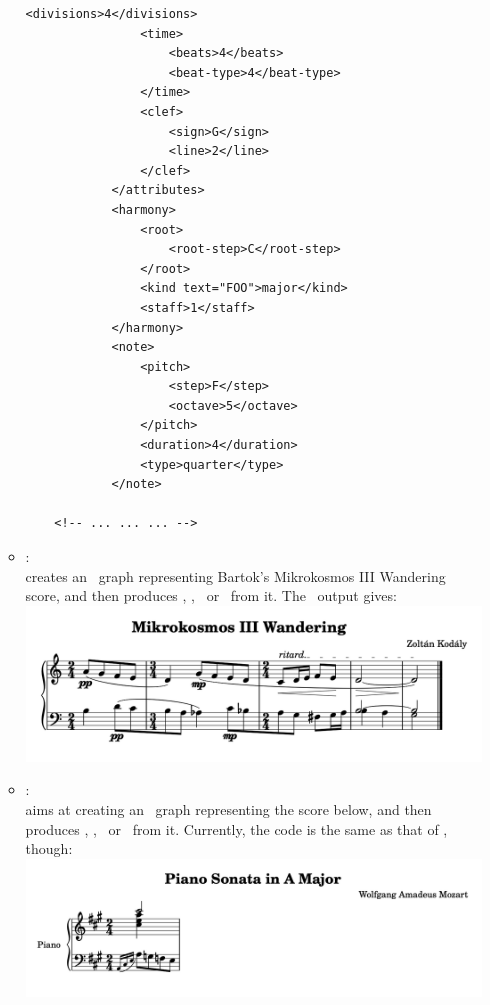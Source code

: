 \begin{itemize}
\begin{itemize}
\begin{lstlisting}[language=MusicXML]
                <divisions>4</divisions>
                <time>
                    <beats>4</beats>
                    <beat-type>4</beat-type>
                </time>
                <clef>
                    <sign>G</sign>
                    <line>2</line>
                </clef>
            </attributes>
            <harmony>
                <root>
                    <root-step>C</root-step>
                </root>
                <kind text="FOO">major</kind>
                <staff>1</staff>
            </harmony>
            <note>
                <pitch>
                    <step>F</step>
                    <octave>5</octave>
                </pitch>
                <duration>4</duration>
                <type>quarter</type>
            </note>

	<!-- ... ... ... -->
\end{lstlisting}


\item {}: \\
creates an \msrRepr\ graph representing Bartok's Mikrokosmos III Wandering score, and then produces \lily, \braille, \mxml\ or \guido\ from it. The \lily\ output gives:\\
\includegraphics[scale=0.7]{../graphics/Mikrokosmos_III_Wandering.png}

\item {}: \\
aims at creating an \lpsrRepr\ graph representing the score below, and then produces \lily, \braille, \mxml\ or \guido\ from it. Currently, the code is the same as that of , though:\\
\includegraphics[scale=0.7]{../graphics/LilyPondIssue34.png}
\end{itemize}



\end{itemize}
